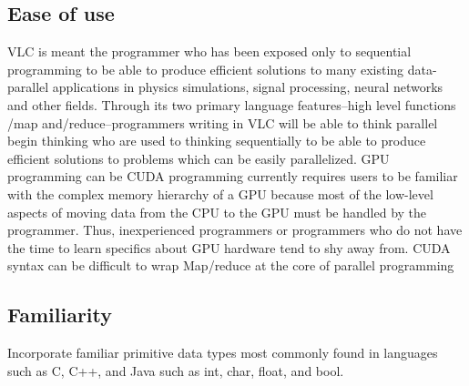 \begin{homeworkProblem}
	\subsection{Ease of use}
	VLC is meant the programmer who has been exposed only to sequential programming to be able to produce efficient solutions to many existing data-parallel applications in physics simulations, signal processing, neural networks and other fields.  Through its two primary language features--high level functions /map and/reduce--programmers writing in VLC will be able to think parallel begin thinking  who are used to thinking sequentially to be able to produce efficient solutions to problems which can be easily parallelized.  
    GPU programming can be CUDA programming currently requires users to be familiar with the complex memory hierarchy of a GPU because most of the low-level aspects of moving data from the CPU to the GPU must be handled by the programmer.  Thus, inexperienced programmers or programmers who do not have the time to learn specifics about GPU hardware tend to shy away from.       CUDA syntax can be difficult to wrap 
	Map/reduce at the core of parallel programming\\
	\subsection{Familiarity}
	Incorporate familiar primitive data types most commonly found in languages such as C, C++, and Java such as int, char, float, and bool. 
\end{homeworkProblem}